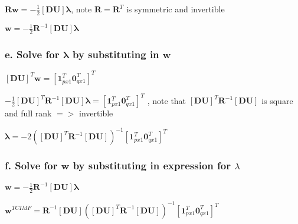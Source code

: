 \documentclass[paper=a4, fontsize=11pt]{scrartcl} %
\numberwithin{equation}{section} %
\numberwithin{figure}{section} %
\numberwithin{table}{section} %
\begin{document}
\(
\bm{R}\bm{w} = -\frac{1}{2}\left[\bm{D}\bm{U}\right]\bm{\lambda}
\), note \(\bm{R} = \bm{R}^T\) is symmetric and invertible

\vspace{2mm}

\(
\bm{w} = -\frac{1}{2}\bm{R}^{-1}\left[\bm{D}\bm{U}\right]\bm{\lambda}
\)

\subsubsection*{e. Solve for \(\bm{\lambda}\) by substituting in \(\bm{w}\)}

\(
\left[\bm{D}\bm{U}\right]^T\bm{w} = \left[\bm{1}_{px1}^T \bm{0}_{qx1}^T\right]^T
\)

\vspace{2mm}

\(
-\frac{1}{2} \left[\bm{D}\bm{U}\right]^T
\bm{R}^{-1}\left[\bm{D}\bm{U}\right]\bm{\lambda}
 = \left[\bm{1}_{px1}^T \bm{0}_{qx1}^T\right]^T
\) ,  note that \(\left[\bm{D}\bm{U}\right]^T\bm{R}^{-1}\left[\bm{D}\bm{U}\right]\) is square and full rank \(=>\) invertible

\vspace{2mm}

\(
\bm{\lambda} = 
-2\left(\left[\bm{D}\bm{U}\right]^T\bm{R}^{-1}\left[\bm{D}\bm{U}\right]\right)^{-1}
\left[\bm{1}_{px1}^T \bm{0}_{qx1}^T\right]^T
\)

\subsubsection*{f. Solve for \(\bm{w}\) by substituting in expression for \(\lambda\)}
\(
\bm{w} = -\frac{1}{2}\bm{R}^{-1}\left[\bm{D}\bm{U}\right]\bm{\lambda}
\)

\vspace{2mm}

\(
\bm{w}^{TCIMF} = \bm{R}^{-1}\left[\bm{D}\bm{U}\right]\left(\left[\bm{D}\bm{U}\right]^T\bm{R}^{-1}\left[\bm{D}\bm{U}\right]\right)^{-1}
\left[\bm{1}_{px1}^T \bm{0}_{qx1}^T\right]^T
\)

\nocite{*}


\end{document}
